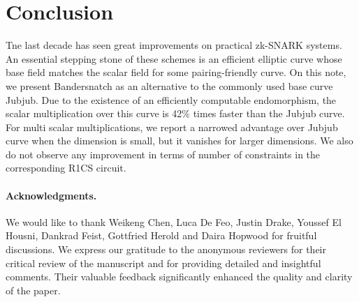 \documentclass[smallextended]{svjour3}
\begin{document}
\section{Conclusion}
Tne last decade has seen great improvements on practical zk-SNARK systems.
An essential stepping stone of these schemes is an efficient elliptic
curve whose base field matches the scalar field for some pairing-friendly curve.
On this note, we present Bandersnatch as an alternative to the commonly used
base curve Jubjub. Due to the existence of an efficiently computable
endomorphism, the scalar multiplication over this curve is 42\% times
faster than the Jubjub curve.
For multi scalar multiplications, we report a narrowed advantage over Jubjub 
curve when the dimension is small, but it vanishes for larger
dimensions.
We also do not observe any improvement in terms of number of constraints in 
the corresponding R1CS circuit.

 \paragraph*{\textbf{Acknowledgments.}} We would like to thank Weikeng
 Chen, Luca De Feo, Justin Drake, Youssef El Housni, Dankrad Feist,
 Gottfried Herold and Daira Hopwood for fruitful discussions. 
 We express our gratitude to the anonymous reviewers for their critical review of the manuscript and for providing detailed and insightful comments. 
 Their valuable feedback significantly enhanced the quality and clarity of the paper.



\end{document}
